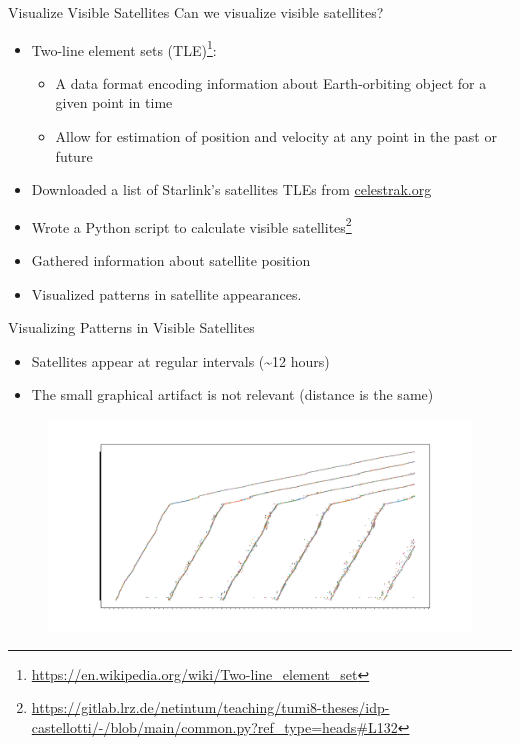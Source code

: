 \documentclass[NET,english,beameralt]{tumbeamer}
\begin{document}
\begin{frame}{Visualize Visible Satellites}
    Can we visualize visible satellites?
    \begin{itemize}
        \item Two-line element sets (TLE)\footnote{\url{https://en.wikipedia.org/wiki/Two-line_element_set}}: 
        \begin{itemize} 
            \item A data format encoding information about Earth-orbiting object for a given point in time
            \item Allow for estimation of position and velocity at any point in the past or future
        \end{itemize}     
        \item Downloaded a list of Starlink's satellites TLEs from \href{celestrak.org}{celestrak.org}
        \item Wrote a Python script to calculate visible
        satellites\footnote{\url{https://gitlab.lrz.de/netintum/teaching/tumi8-theses/idp-castellotti/-/blob/main/common.py?ref_type=heads\#L132}}
        \item Gathered information about satellite position
        \item Visualized patterns in satellite appearances.
    \end{itemize}
\end{frame}

\begin{frame}{Visualizing Patterns in Visible Satellites}
    \begin{itemize}
        \item Satellites appear at regular intervals (\textasciitilde12 hours)
        \item The small graphical artifact is not relevant (distance is the same)
    \end{itemize}
    \begin{figure}
        \includegraphics[width=1\textwidth]{pics/patterns-in-satellite-appearances.pdf}
    \end{figure}
\end{frame}
\end{document}
